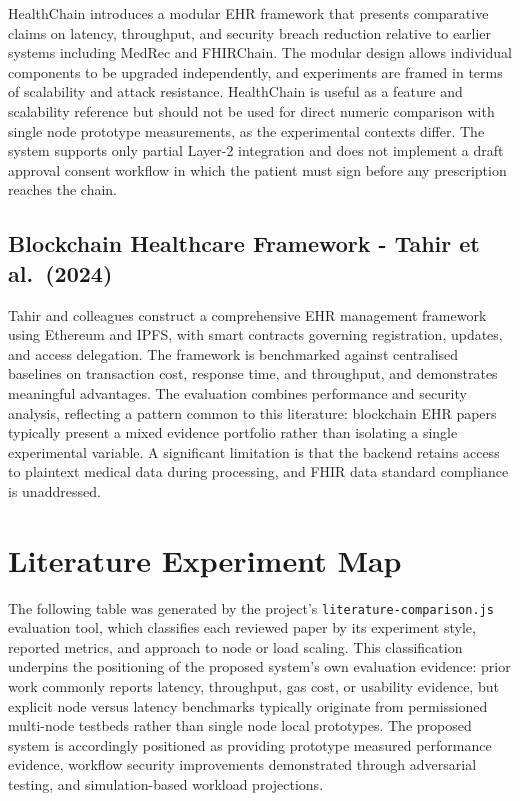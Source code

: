 \documentclass[12pt,a4wide]{report}
\begin{document}
HealthChain introduces a modular EHR framework that presents comparative claims
on latency, throughput, and security breach reduction relative to earlier systems
including MedRec and FHIRChain. The modular design allows individual components
to be upgraded independently, and experiments are framed in terms of scalability
and attack resistance. HealthChain is useful as a feature and scalability reference
but should not be used for direct numeric comparison with single node prototype
measurements, as the experimental contexts differ. The system supports only partial
Layer-2 integration and does not implement a draft approval consent workflow in
which the patient must sign before any prescription reaches the chain.

\subsection{Blockchain Healthcare Framework - Tahir et al.\ (2024)}

Tahir and colleagues construct a comprehensive EHR management framework using
Ethereum and IPFS, with smart contracts governing registration, updates, and access
delegation. The framework is benchmarked against centralised baselines on transaction
cost, response time, and throughput, and demonstrates meaningful advantages. The
evaluation combines performance and security analysis, reflecting a pattern common
to this literature: blockchain EHR papers typically present a mixed evidence
portfolio rather than isolating a single experimental variable. A significant
limitation is that the backend retains access to plaintext medical data during
processing, and FHIR data standard compliance is unaddressed.

\section{Literature Experiment Map}

The following table was generated by the project's \texttt{literature-comparison.js}
evaluation tool, which classifies each reviewed paper by its experiment style,
reported metrics, and approach to node or load scaling. This classification
underpins the positioning of the proposed system's own evaluation evidence: prior work
commonly reports latency, throughput, gas cost, or usability evidence, but
explicit node versus latency benchmarks typically originate from permissioned
multi-node testbeds rather than single node local prototypes. The proposed system is
accordingly positioned as providing prototype measured performance evidence,
workflow security improvements demonstrated through adversarial testing, and
simulation-based workload projections.
\end{document}
